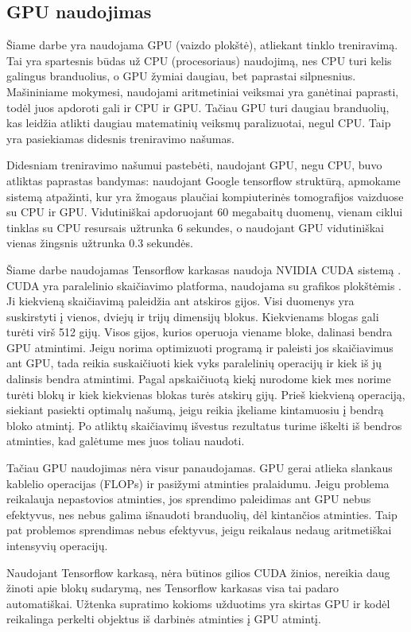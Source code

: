 \documentclass{VUMIFInfKursinis}
\begin{document}
\subsection{GPU naudojimas}
\par
Šiame darbe yra naudojama GPU (vaizdo plokštė), atliekant tinklo treniravimą. Tai yra spartesnis būdas už CPU (procesoriaus)
naudojimą, nes CPU turi kelis galingus branduolius, o GPU žymiai daugiau, bet paprastai silpnesnius. Mašininiame mokymesi,
naudojami aritmetiniai veiksmai yra ganėtinai paprasti, todėl juos apdoroti gali ir CPU ir GPU.
Tačiau GPU turi daugiau branduolių, kas leidžia atlikti daugiau matematinių veiksmų paralizuotai,
negul CPU. Taip yra pasiekiamas didesnis treniravimo našumas.
\par
Didesniam treniravimo našumui pastebėti, naudojant GPU, negu CPU, buvo atliktas paprastas bandymas:
naudojant Google tensorflow struktūrą, apmokame sistemą atpažinti, kur yra žmogaus plaučiai kompiuterinės
tomografijos vaizduose su CPU ir GPU. Vidutiniškai apdoruojant 60 megabaitų duomenų, vienam ciklui
tinklas su CPU resursais užtrunka 6 sekundes, o naudojant GPU vidutiniškai vienas žingsnis užtrunka
0.3 sekundės.
\par
Šiame darbe naudojamas Tensorflow karkasas naudoja NVIDIA CUDA sistemą \cite{salt4}.
CUDA yra paralelinio skaičiavimo platforma, naudojama su grafikos plokštėmis \cite{salt5}.
Ji kiekvieną skaičiavimą paleidžia ant atskiros gijos. Visi duomenys yra suskirstyti
į vienos, dviejų ir trijų dimensijų blokus. Kiekvienams blogas gali turėti virš 512
gijų. Visos gijos, kurios operuoja viename bloke, dalinasi bendra GPU atmintimi.
Jeigu norima optimizuoti programą ir paleisti jos skaičiavimus ant GPU, tada reikia
suskaičiuoti kiek vyks paralelinių operacijų ir kiek iš jų dalinsis bendra atmintimi.
Pagal apskaičiuotą kiekį nurodome kiek mes norime turėti blokų ir kiek kiekvienas blokas
turės atskirų gijų. Prieš kiekvieną operaciją, siekiant pasiekti optimalų našumą, jeigu
reikia įkeliame kintamuosiu į bendrą bloko atmintį. Po atliktų skaičiavimų išvestus
rezultatus turime iškelti iš bendros atminties, kad galėtume mes juos toliau naudoti.
\par
Tačiau GPU naudojimas nėra visur panaudojamas. GPU gerai atlieka slankaus kablelio
operacijas (FLOPs) ir pasižymi atminties pralaidumu. Jeigu problema reikalauja nepastovios atminties,
jos sprendimo paleidimas ant GPU nebus efektyvus, nes nebus galima išnaudoti branduolių,
dėl kintančios atminties. Taip pat problemos sprendimas nebus efektyvus, jeigu
reikalaus nedaug aritmetiškai intensyvių operacijų.
\par
Naudojant Tensorflow karkasą, nėra būtinos gilios CUDA žinios, nereikia daug žinoti apie blokų sudarymą, nes Tensorflow karkasas visa tai padaro automatiškai. Užtenka supratimo kokioms užduotims yra skirtas GPU ir kodėl reikalinga perkelti objektus iš darbinės atminties į GPU atmintį.
\end{document}
